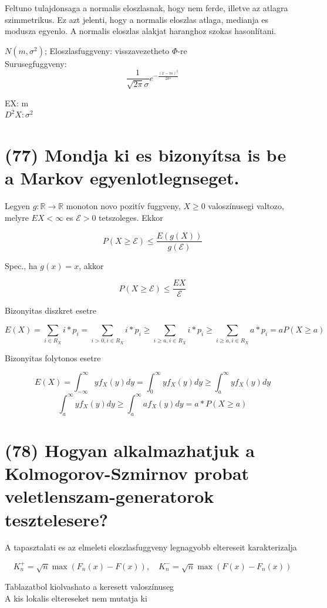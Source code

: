 \documentclass[12p]{article}
\begin{document}
Feltuno tulajdonsaga a normalis eloszlasnak, hogy nem ferde, illetve az atlagra szimmetrikus. Ez azt jelenti, hogy a normalis eloszlas atlaga, medianja es modusza egyenlo. A normalis eloszlas alakjat haranghoz szokas hasonlítani.

$N(m, \sigma^2)$; Eloszlasfuggveny: visszavezetheto $\Phi$-re\\ Surusegfuggveny: $$\displaystyle{\frac{1}{\sqrt{2\pi} \sigma}e^{-\frac{(x-m)^2}{2\sigma^2}}}$$

EX: m\\
$D^2X: \sigma^2$

\section{(77) Mondja ki es bizonyítsa is be a Markov egyenlotlegnseget.}

Legyen $g : \mathbb{R} \rightarrow \mathbb{R}$ monoton novo pozitív fuggveny, $X \geq 0$ valoszínusegi valtozo, melyre $EX < \infty$ es $\mathcal{E} > 0$ tetszoleges. Ekkor

$$P(X \geq \mathcal{E}) \leq \frac{E(g(X))}{g(\mathcal{E})}$$

Spec., ha $g(x) = x$, akkor

$$P(X \geq \mathcal{E}) \leq \frac{EX}{\mathcal{E}}$$

Bizonyitas diszkret esetre

$$E(X) = \sum_{i \in R_X} i*p_i = \sum_{i>0,i\in R_X} i*p_i \geq \sum_{i \geq a, i\in R_X} i*p_i \geq \sum_{i\geq a, i\in R_X} a*p_i = aP(X \geq a)$$

Bizonyitas folytonos esetre

$$E(X) = \int_{-\infty}^{\infty} yf_X(y)dy = \int_{0}^{\infty} yf_X(y)dy \geq \int_{a}^{\infty} yf_X(y)dy$$
$$\int_{a}^{\infty}yf_X(y)dy \geq \int_{a}^{\infty} af_X(y)dy = a * P(X \geq a)$$

\section{(78) Hogyan alkalmazhatjuk a Kolmogorov-Szmirnov probat veletlenszam-generatorok tesztelesere?}

A tapasztalati es az elmeleti eloszlasfuggveny
legnagyobb eltereseit karakterizalja

$$K_n^{+} = \sqrt{n} \max (F_n(x) - F(x)), \quad K_n^{-}=\sqrt{n} \max(F(x) - F_n(x))$$

Tablazatbol kiolvashato a keresett valoszínuseg\\
A kis lokalis eltereseket nem mutatja ki
\end{document}
